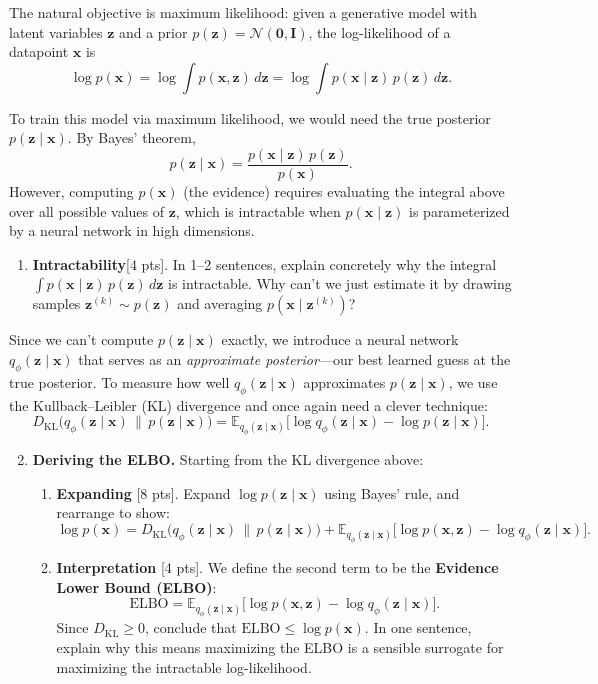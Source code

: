 \documentclass[submit]{harvardml}
\newcommand{\E}{\mathbb{E}}
\newcommand{\KL}{D_{\mathrm{KL}}}
\newcommand{\bx}{\mathbf{x}}
\newcommand{\bz}{\mathbf{z}}
\begin{document}
\begin{problem}
\begin{enumerate}
The natural objective is maximum likelihood: given a generative model with latent variables $\bz$ and a prior $p(\bz) = \mathcal{N}(\bm{0}, \mathbf{I})$, the log-likelihood of a datapoint $\bx$ is
\[
  \log p(\bx) = \log \int p(\bx, \bz)\, d\bz = \log \int p(\bx \mid \bz)\, p(\bz)\, d\bz.
\]

To train this model via maximum likelihood, we would need the true posterior $p(\bz \mid \bx)$. By Bayes' theorem,
\[
  p(\bz \mid \bx) = \frac{p(\bx \mid \bz)\, p(\bz)}{p(\bx)}.
\]
However, computing $p(\bx)$ (the evidence) requires evaluating the integral above over all possible values of $\bz$, which is intractable when $p(\bx \mid \bz)$ is parameterized by a neural network in high dimensions.

\begin{enumerate}

\item \textbf{Intractability}[4 pts]. In 1--2 sentences, explain concretely why the integral $\int p(\bx \mid \bz)\,p(\bz)\,d\bz$ is intractable. Why can't we just estimate it by drawing samples $\bz^{(k)} \sim p(\bz)$ and averaging $p(\bx \mid \bz^{(k)})$?
\end{enumerate}

Since we can't compute $p(\bz \mid \bx)$ exactly, we introduce a neural network $q_\phi(\bz \mid \bx)$ that serves as an \textit{approximate posterior}---our best learned guess at the true posterior. To measure how well $q_\phi(\bz \mid \bx)$ approximates $p(\bz \mid \bx)$, we use the Kullback--Leibler (KL) divergence and once again need a clever technique:
\[
  \KL\!\big(q_\phi(\bz \mid \bx) \,\|\, p(\bz \mid \bx)\big) = \E_{q_\phi(\bz \mid \bx)}\!\Big[\log q_\phi(\bz \mid \bx) - \log p(\bz \mid \bx)\Big].
\]

\begin{enumerate}
\setcounter{enumii}{1}
\item \textbf{Deriving the ELBO.} Starting from the KL divergence above:

\begin{enumerate}
  \item \textbf{Expanding} [8 pts]. Expand $\log p(\bz \mid \bx)$ using Bayes' rule, and rearrange to show:
  \[
    \log p(\bx) = \KL\!\big(q_\phi(\bz \mid \bx) \,\|\, p(\bz \mid \bx)\big) + \E_{q_\phi(\bz \mid \bx)}\!\Big[\log p(\bx, \bz) - \log q_\phi(\bz \mid \bx)\Big].
  \]

  \item \textbf{Interpretation} [4 pts]. We define the second term to be the \textbf{Evidence Lower Bound (ELBO)}:
  \[
    \mathrm{ELBO} = \E_{q_\phi(\bz \mid \bx)}\!\Big[\log p(\bx, \bz) - \log q_\phi(\bz \mid \bx)\Big].
  \]
  Since $\KL \geq 0$, conclude that $\mathrm{ELBO} \leq \log p(\bx)$. In one sentence, explain why this means maximizing the ELBO is a sensible surrogate for maximizing the intractable log-likelihood.


\end{enumerate}
\end{enumerate}
\end{enumerate}
\end{problem}
\end{document}
